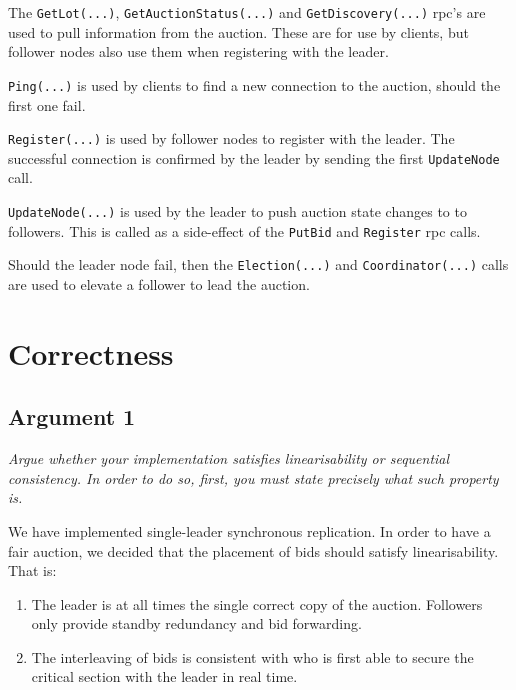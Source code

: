 \documentclass[a4paper,11pt]{article}
\begin{document}
The \texttt{GetLot(...)}, \texttt{GetAuctionStatus(...)} and \texttt{GetDiscovery(...)} rpc's are used to pull information from the auction. These are for use by clients, but follower nodes also use them when registering with the leader. 

\bigbreak

\texttt{Ping(...)} is used by clients to find a new connection to the auction, should the first one fail. 

\bigbreak

\texttt{Register(...)} is used by follower nodes to register with the leader. The successful connection is confirmed by the leader by sending the first \texttt{UpdateNode} call. 

\bigbreak

\texttt{UpdateNode(...)} is used by the leader to push auction state changes to to followers. This is called as a side-effect of the \texttt{PutBid} and \texttt{Register} rpc calls. 

\bigbreak

Should the leader node fail, then the \texttt{Election(...)} and \texttt{Coordinator(...)} calls are used to elevate a follower to lead the auction. 

\pagebreak

\section{Correctness}

\subsection{Argument 1}

\textit{Argue whether your implementation satisfies linearisability or sequential consistency. In order to do so, first, you must state precisely what such property is.}

\bigbreak

We have implemented single-leader synchronous replication. In order to have a fair auction, we decided that the placement of bids should satisfy linearisability. That is:

\begin{enumerate}
    \item The leader is at all times the single correct copy of the auction. Followers only provide standby redundancy and bid forwarding. 
    \item The interleaving of bids is consistent with who is first able to secure the critical section with the leader in real time. 
\end{enumerate}
\end{document}
